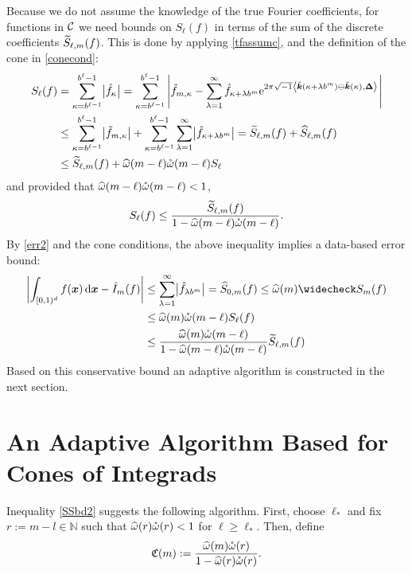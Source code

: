 \documentclass[graybox]{svmult}
\newcommand{\N}{\mathbb{N}} %
\newcommand{\bsx}{\boldsymbol{x}}    %
\newcommand{\bsDelta}{\boldsymbol{\Delta}}    %
\begin{document}
Because we do not assume the knowledge of the true  Fourier  coefficients, for functions in $\mathcal{C}$ we need bounds on $S_{\ell}(f)$ in terms of the sum of the discrete coefficients $\widetilde{S}_{\ell,m}(f)$.  This is done by applying \eqref{tfassumc},  and the definition of the cone in \eqref{conecond}:
\begin{align}
\nonumber
S_\ell(f) &= \sum_{\kappa=b^{\ell-1}}^{b^{\ell}-1} \bigl \lvert \hf_{\kappa}\bigr\rvert= \sum_{\kappa=b^{\ell-1}}^{b^{\ell}-1} \abs{\tf_{m,\kappa} - \sum_{\lambda=1}^{\infty} \hf_{\kappa+\lambda b^{m}} \E^{2 \pi \sqrt{-1} \ip{\tvk(\kappa+\lambda b^{m}) \ominus \tvk(\kappa)}{\bsDelta}}}\\
\nonumber
&\le \sum_{\kappa=b^{\ell-1}}^{b^{\ell}-1} \bigl \lvert \tf_{m,\kappa} \bigr\rvert + \sum_{\kappa=b^{\ell-1}}^{b^{\ell}-1} \sum_{\lambda=1}^{\infty} \bigl \lvert \hf_{\kappa+\lambda b^{m}}\bigr\rvert = \tS_{\ell,m}(f) + \hS_{\ell,m}(f) \\
\label{boundSumbsApproxa}
&\le \tS_{\ell,m}(f) + \homega(m-\ell) \wcomega(m-\ell) S_\ell\
\end{align}
and provided that $\widehat{\omega}(m-\ell) \mathring{\omega}(m-\ell)<1$,
\begin{equation}\label{boundSumsApproxb}
S_\ell(f) \le \frac{\tS_{\ell,m}(f)}{1 - \homega(m-\ell) \wcomega(m-\ell)}.
\end{equation}
By \eqref{err2} and the cone conditions, the above inequality implies a data-based error bound:
\begin{align}
\nonumber
\biggabs{\int_{\cube} f(\bsx) \, \D \bsx - \hI_m(f) }
&\le \sum_{\lambda=1}^{\infty} \bigabs{\hf_{\lambda b^{m}}} 
= \hS_{0,m}(f)\le \homega(m) \wcS_m(f)\\
\nonumber
&  \le \homega(m) \wcomega(m-\ell) S_\ell(f)\\
& \le  \frac{\homega(m) \wcomega(m-\ell)}{1 - \homega(m-\ell) \wcomega(m-\ell)}\tS_{\ell,m}(f)
\label{SSbd2}
\end{align}
Based on this conservative bound an adaptive algorithm is constructed in the next section. 

\section{An Adaptive Algorithm Based for Cones of Integrads}\label{algorithmsection}

Inequality \eqref{SSbd2} suggests the following algorithm. First, choose $\ell_*$ and fix $r:=m-l \in \N$ such that $\widehat{\omega}(r)\mathring{\omega}(r)<1$ for $\ell\geq\ell_*$. Then, define
\[
\mathfrak{C}(m):= \frac{\widehat{\omega}(m) \mathring{\omega}(r)}{1 - \widehat{\omega}(r) \mathring{\omega}(r)}.
\]
\end{document}
